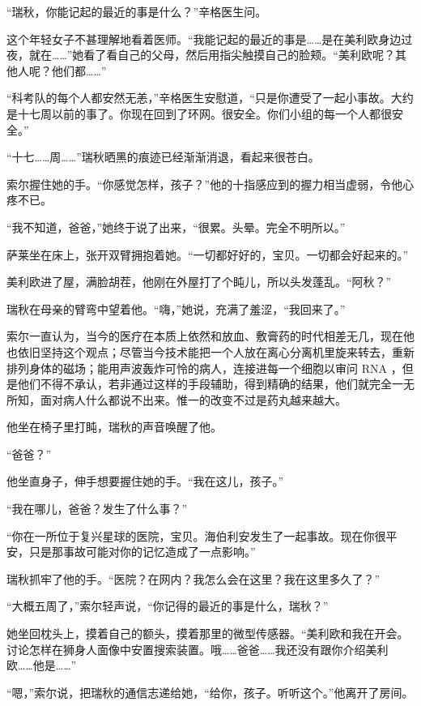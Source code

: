 \documentclass[AutoFakeBold=true]{book}
\begin{document}
``瑞秋，你能记起的最近的事是什么？''辛格医生问。

这个年轻女子不甚理解地看着医师。``我能记起的最近的事是……是在美利欧身边过夜，就在……''她看了看自己的父母，然后用指尖触摸自己的脸颊。``美利欧呢？其他人呢？他们都……''

``科考队的每个人都安然无恙，''辛格医生安慰道，``只是你遭受了一起小事故。大约是十七周以前的事了。你现在回到了环网。很安全。你们小组的每一个人都很安全。''

``十七……周……''瑞秋晒黑的痕迹已经渐渐消退，看起来很苍白。

索尔握住她的手。``你感觉怎样，孩子？''他的十指感应到的握力相当虚弱，令他心疼不已。

``我不知道，爸爸，''她终于说了出来，``很累。头晕。完全不明所以。''

萨莱坐在床上，张开双臂拥抱着她。``一切都好好的，宝贝。一切都会好起来的。''

美利欧进了屋，满脸胡茬，他刚在外屋打了个盹儿，所以头发蓬乱。``阿秋？''

瑞秋在母亲的臂弯中望着他。``嗨，''她说，充满了羞涩，``我回来了。''

\vspace*{1em}

索尔一直认为，当今的医疗在本质上依然和放血、敷膏药的时代相差无几，现在他也依旧坚持这个观点；尽管当今技术能把一个人放在离心分离机里旋来转去，重新排列身体的磁场；能用声波轰炸可怜的病人，连接进每一个细胞以审问 RNA ，但是他们不得不承认，若非通过这样的手段辅助，得到精确的结果，他们就完全一无所知，面对病人什么都说不出来。惟一的改变不过是药丸越来越大。

他坐在椅子里打盹，瑞秋的声音唤醒了他。

``爸爸？''

他坐直身子，伸手想要握住她的手。``我在这儿，孩子。''

``我在哪儿，爸爸？发生了什么事？''

``你在一所位于复兴星球的医院，宝贝。海伯利安发生了一起事故。现在你很平安，只是那事故可能对你的记忆造成了一点影响。''

瑞秋抓牢了他的手。``医院？在网内？我怎么会在这里？我在这里多久了？''

``大概五周了，''索尔轻声说，``你记得的最近的事是什么，瑞秋？''

她坐回枕头上，摸着自己的额头，摸着那里的微型传感器。``美利欧和我在开会。讨论怎样在狮身人面像中安置搜索装置。哦……爸爸……我还没有跟你介绍美利欧……他是……''

``嗯，''索尔说，把瑞秋的通信志递给她，``给你，孩子。听听这个。''他离开了房间。
\end{document}
